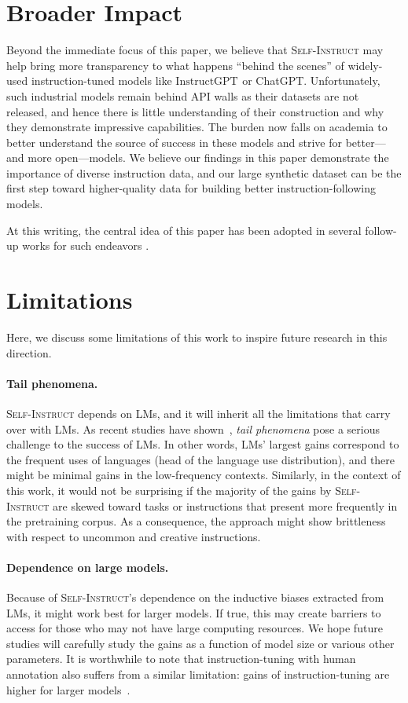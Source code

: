 \section{Broader Impact}

Beyond the immediate focus of this paper, we believe that \textsc{Self-Instruct} may help bring more transparency to what happens ``behind the scenes'' of widely-used instruction-tuned models like $\text{InstructGPT}_{\text{}}$ or ChatGPT. Unfortunately, such industrial models remain behind API walls as their datasets are not released, and hence there is little understanding of their construction and why they demonstrate impressive capabilities. The burden now falls on academia to better understand the source of success in these models and strive for better---and more open---models. We believe our findings in this paper demonstrate the importance of diverse instruction data, and our large synthetic dataset can be the first step toward higher-quality data for building better instruction-following models. 

At this writing, the central idea of this paper has been adopted in several follow-up works for such endeavors \citep[i.a.]{alpaca,xu2023baize,sun2023principle}. 

\section{Limitations}
Here, we discuss some limitations of this work to inspire future research in this direction.  

\paragraph{Tail phenomena.} 
\textsc{Self-Instruct} depends on LMs, and it will inherit all the limitations that carry over with LMs. As recent studies have shown~\cite{razeghi2022impact,kandpal2022large},  \emph{tail phenomena} pose a serious challenge to the success of LMs. In other words, LMs' largest gains correspond to the frequent uses of languages (head of the language use distribution), and there might be minimal gains in the low-frequency contexts. Similarly, in the context of this work, it would not be surprising if the majority of the gains by \textsc{Self-Instruct} are skewed toward tasks or instructions that present more frequently in the pretraining corpus. As a consequence, the approach might show brittleness with respect to uncommon and creative instructions.

\paragraph{Dependence on large models.} Because of \textsc{Self-Instruct}'s dependence on the inductive biases extracted from LMs, it might work best for larger models. If true, this may create barriers to access for those who may not have large computing resources. We hope future studies will carefully study the gains as a function of model size or various other parameters. It is worthwhile to note that instruction-tuning with human annotation also suffers from a similar limitation: gains of instruction-tuning are higher for larger models~\cite{wei2022finetuned}. 

